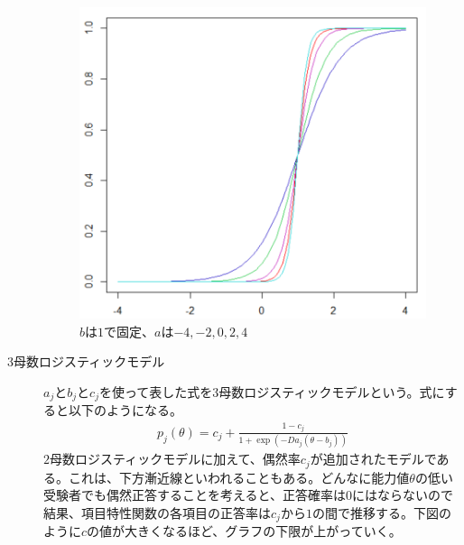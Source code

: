 \documentclass[12pt]{jarticle}
\numberwithin{equation}{subsection}
\begin{document}
\begin{description}
\begin{figure}[H]
    \includegraphics[bb = 500 100 1 1,scale = 0.25]{A.png}
    \vspace{1cm}
    \caption{$b$は$1$で固定、$a$は$-4, -2, 0, 2, 4$}
  \end{figure}
  \item[3母数ロジスティックモデル]
  $a_j$と$b_j$と$c_j$を使って表した式を3母数ロジスティックモデルという。式にすると以下のようになる。
  \begin{align}
    \label{04}
    \displaystyle p_j(\theta) = c_j + \frac{1-c_j}{1+\exp(-Da_j(\theta - b_j))}
  \end{align}
  $2$母数ロジスティックモデルに加えて、偶然率$c_j$が追加されたモデルである。これは、下方漸近線といわれることもある。どんなに能力値$\theta$の低い受験者でも偶然正答することを考えると、正答確率は$0$にはならないので結果、項目特性関数の各項目の正答率は$c_j$から$1$の間で推移する。下図のように$c$の値が大きくなるほど、グラフの下限が上がっていく。
  \vspace{3.8cm}
  \begin{figure}[H]
    \centering

\end{figure}
\end{description}
\end{document}
